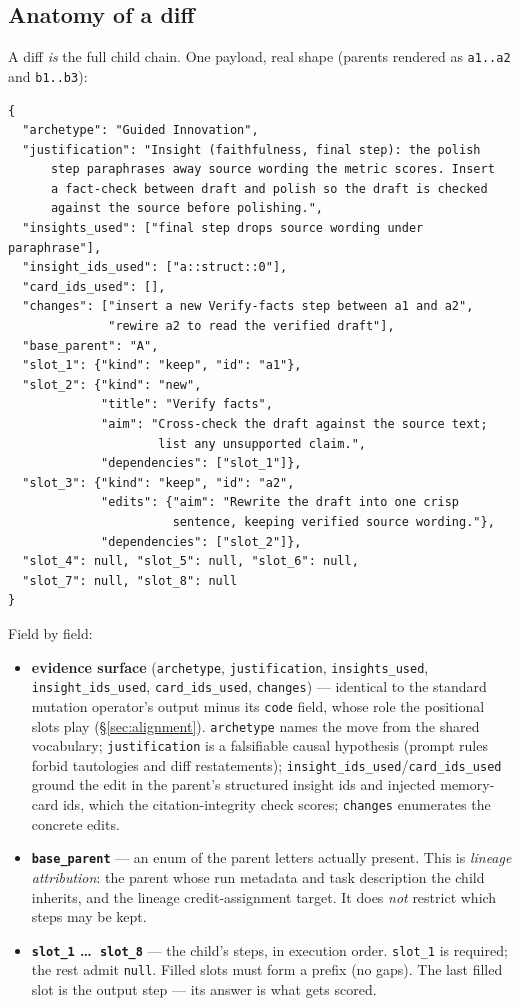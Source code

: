 \documentclass[11pt]{article}
\begin{document}
\subsection{Anatomy of a diff}
A diff \emph{is} the full child chain. One payload, real shape (parents rendered as
\texttt{a1..a2} and \texttt{b1..b3}):
\begin{lstlisting}
{
  "archetype": "Guided Innovation",
  "justification": "Insight (faithfulness, final step): the polish
      step paraphrases away source wording the metric scores. Insert
      a fact-check between draft and polish so the draft is checked
      against the source before polishing.",
  "insights_used": ["final step drops source wording under paraphrase"],
  "insight_ids_used": ["a::struct::0"],
  "card_ids_used": [],
  "changes": ["insert a new Verify-facts step between a1 and a2",
              "rewire a2 to read the verified draft"],
  "base_parent": "A",
  "slot_1": {"kind": "keep", "id": "a1"},
  "slot_2": {"kind": "new",
             "title": "Verify facts",
             "aim": "Cross-check the draft against the source text;
                     list any unsupported claim.",
             "dependencies": ["slot_1"]},
  "slot_3": {"kind": "keep", "id": "a2",
             "edits": {"aim": "Rewrite the draft into one crisp
                       sentence, keeping verified source wording."},
             "dependencies": ["slot_2"]},
  "slot_4": null, "slot_5": null, "slot_6": null,
  "slot_7": null, "slot_8": null
}
\end{lstlisting}
Field by field:
\begin{itemize}
  \item \textbf{evidence surface} (\texttt{archetype}, \texttt{justification},
  \texttt{insights\_used}, \texttt{insight\_ids\_used}, \texttt{card\_ids\_used},
  \texttt{changes}) --- identical to the standard mutation operator's output minus its
  \texttt{code} field, whose role the positional slots play (\S\ref{sec:alignment}).
  \texttt{archetype} names the move from the shared vocabulary; \texttt{justification} is a
  falsifiable causal hypothesis (prompt rules forbid tautologies and diff restatements);
  \texttt{insight\_ids\_used}/\texttt{card\_ids\_used} ground the edit in the parent's
  structured insight ids and injected memory-card ids, which the citation-integrity check
  scores; \texttt{changes} enumerates the concrete edits.
  \item \textbf{\texttt{base\_parent}} --- an enum of the parent letters actually present.
  This is \emph{lineage attribution}: the parent whose run metadata and task description the
  child inherits, and the lineage credit-assignment target. It does \emph{not} restrict which
  steps may be kept.
  \item \textbf{\texttt{slot\_1} \dots\ \texttt{slot\_8}} --- the child's steps, in execution
  order. \texttt{slot\_1} is required; the rest admit \texttt{null}. Filled slots must form a
  prefix (no gaps). The last filled slot is the output step --- its answer is what gets
  scored.
\end{itemize}
\end{document}
